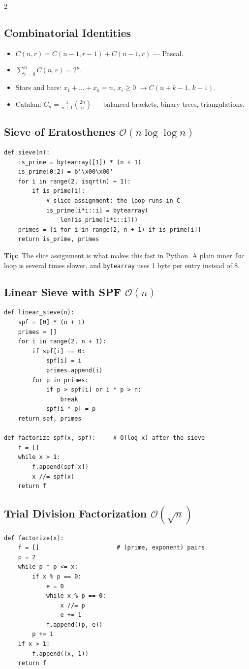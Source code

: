 \documentclass[10pt]{article}
\newcommand{\code}[1]{\texttt{\small #1}}
\newcommand{\sub}[2]{\subsection[#1]{#1\hspace{0.6em}%
  \textnormal{\color{accent2}\small$\mathcal{O}(#2)$}}}
\newcommand{\tip}[1]{{\color{tipc}\footnotesize\textbf{Tip:}}~{\footnotesize #1}\par}
\begin{document}
\begin{multicols}{2}
\subsection{Combinatorial Identities}
\begin{itemize}
    \item $C(n,r) = C(n-1,r-1) + C(n-1,r)$ --- Pascal.
    \item $\sum_{r=0}^{n} C(n,r) = 2^n$.
    \item Stars and bars: $x_1+\dots+x_k=n$, $x_i \ge 0$
          $\rightarrow C(n+k-1,\,k-1)$.
    \item Catalan: $C_n = \frac{1}{n+1}\binom{2n}{n}$ --- balanced
          brackets, binary trees, triangulations.
\end{itemize}

\sub{Sieve of Eratosthenes}{n \log\log n}
\begin{lstlisting}
def sieve(n):
    is_prime = bytearray([1]) * (n + 1)
    is_prime[0:2] = b'\x00\x00'
    for i in range(2, isqrt(n) + 1):
        if is_prime[i]:
            # slice assignment: the loop runs in C
            is_prime[i*i::i] = bytearray(
                len(is_prime[i*i::i]))
    primes = [i for i in range(2, n + 1) if is_prime[i]]
    return is_prime, primes
\end{lstlisting}
\tip{The slice assignment is what makes this fast in Python. A plain
inner \code{for} loop is several times slower, and
\code{bytearray} uses 1 byte per entry instead of 8.}

\sub{Linear Sieve with SPF}{n}
\begin{lstlisting}
def linear_sieve(n):
    spf = [0] * (n + 1)
    primes = []
    for i in range(2, n + 1):
        if spf[i] == 0:
            spf[i] = i
            primes.append(i)
        for p in primes:
            if p > spf[i] or i * p > n:
                break
            spf[i * p] = p
    return spf, primes

def factorize_spf(x, spf):     # O(log x) after the sieve
    f = []
    while x > 1:
        f.append(spf[x])
        x //= spf[x]
    return f
\end{lstlisting}

\sub{Trial Division Factorization}{\sqrt n}
\begin{lstlisting}
def factorize(x):
    f = []                      # (prime, exponent) pairs
    p = 2
    while p * p <= x:
        if x % p == 0:
            e = 0
            while x % p == 0:
                x //= p
                e += 1
            f.append((p, e))
        p += 1
    if x > 1:
        f.append((x, 1))
    return f
\end{lstlisting}


\end{multicols}
\end{document}
